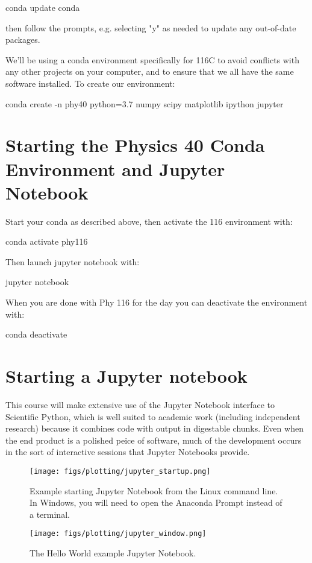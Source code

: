   conda update conda

then follow the prompts, e.g. selecting "y" as needed to update any out-of-date packages.

We'll be using a conda environment specifically for 116C to avoid
conflicts with any other projects on your computer, and to ensure that
we all have the same software installed.  To create our environment:

  conda create -n phy40 python=3.7 numpy scipy matplotlib ipython jupyter

\section{Starting the Physics 40 Conda Environment and Jupyter Notebook}

Start your conda as described above, then activate the 116 environment with:

  conda activate phy116

Then launch jupyter notebook with:

  jupyter notebook

When you are done with Phy 116 for the day you can deactivate the environment with:

  conda deactivate

\section{Starting a Jupyter notebook}

This course will make extensive use of the Jupyter Notebook interface
to Scientific Python, which is well suited to academic work (including
independent research) because it combines code with output in
digestable chunks.  Even when the end product is a polished peice of
software, much of the development occurs in the sort of interactive
sessions that Jupyter Notebooks provide.  

\begin{figure}[htbp]
\begin{center}
\texttt{[image: figs/plotting/jupyter\_startup.png]} 
\caption{Example starting Jupyter Notebook from the Linux command line.  In Windows, you will need to open the Anaconda Prompt instead of a terminal.}
\label{fig:jupyterstartup}
\end{center}
\end{figure}

\begin{figure}[htbp]
\begin{center}
\texttt{[image: figs/plotting/jupyter\_window.png]} 
\caption{The Hello World example Jupyter Notebook.}
\label{fig:jupyterwindow}
\end{center}
\end{figure}

